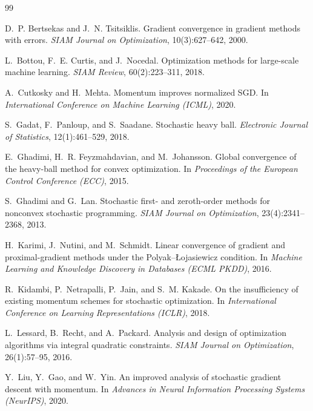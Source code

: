 \begin{thebibliography}{99}
\small

D.~P. Bertsekas and J.~N. Tsitsiklis.
\newblock Gradient convergence in gradient methods with errors.
\newblock \emph{SIAM Journal on Optimization}, 10(3):627--642, 2000.

L.~Bottou, F.~E. Curtis, and J.~Nocedal.
\newblock Optimization methods for large-scale machine learning.
\newblock \emph{SIAM Review}, 60(2):223--311, 2018.

A.~Cutkosky and H.~Mehta.
\newblock Momentum improves normalized {SGD}.
\newblock In \emph{International Conference on Machine Learning (ICML)}, 2020.

S.~Gadat, F.~Panloup, and S.~Saadane.
\newblock Stochastic heavy ball.
\newblock \emph{Electronic Journal of Statistics}, 12(1):461--529, 2018.

E.~Ghadimi, H.~R. Feyzmahdavian, and M.~Johansson.
\newblock Global convergence of the heavy-ball method for convex optimization.
\newblock In \emph{Proceedings of the European Control Conference (ECC)}, 2015.

S.~Ghadimi and G.~Lan.
\newblock Stochastic first- and zeroth-order methods for nonconvex stochastic programming.
\newblock \emph{SIAM Journal on Optimization}, 23(4):2341--2368, 2013.

H.~Karimi, J.~Nutini, and M.~Schmidt.
\newblock Linear convergence of gradient and proximal-gradient methods under the
  {P}olyak--{\L}ojasiewicz condition.
\newblock In \emph{Machine Learning and Knowledge Discovery in Databases (ECML PKDD)}, 2016.

R.~Kidambi, P.~Netrapalli, P.~Jain, and S.~M. Kakade.
\newblock On the insufficiency of existing momentum schemes for stochastic optimization.
\newblock In \emph{International Conference on Learning Representations (ICLR)}, 2018.

L.~Lessard, B.~Recht, and A.~Packard.
\newblock Analysis and design of optimization algorithms via integral quadratic constraints.
\newblock \emph{SIAM Journal on Optimization}, 26(1):57--95, 2016.

Y.~Liu, Y.~Gao, and W.~Yin.
\newblock An improved analysis of stochastic gradient descent with momentum.
\newblock In \emph{Advances in Neural Information Processing Systems (NeurIPS)}, 2020.


\end{thebibliography}
